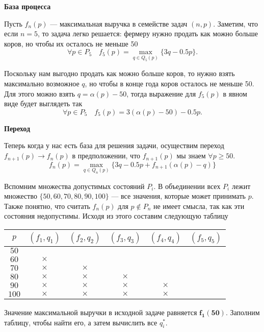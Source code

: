 \bigskip

\textbf{База процесса}

Пусть $f_n(p)$ --- максимальная выручка в семействе задач $(n, p)$. Заметим, что если $n = 5$, то задача легко решается: фермеру нужно продать как можно больше коров, но чтобы их осталось не меньше 50
\[
\forall p \in P_5 \quad f_5(p) = \max_{q \in Q_5(p)} \{3q - 0.5p\}.
\]

Поскольку нам выгодно продать как можно больше коров, то нужно взять максимально возможное $q$, но чтобы в конце года коров осталось не меньше 50. Для этого можно взять $q = \alpha(p) - 50$, тогда выражение для $f_5(p)$ в явном виде будет выглядеть так
\[
\forall p \in P_5 \quad f_5(p) = 3(\alpha(p) - 50) - 0.5p.
\]

\bigskip

\textbf{Переход}

Теперь когда у нас есть база для решения задачи, осуществим переход $f_{n+1}(p) \to f_n(p)$ в предположении, что $f_{n+1}(p)$ мы знаем $\forall p \ge 50$.
\[
\boxed{f_n(p) = \max_{q \in Q_n(p)} \Big\{3q - 0.5p + f_{n + 1}(\alpha(p) - q)\Big\}}\tag{**}
\]

Вспомним множества допустимых состояний $P_i$. В объединении всех $P_i$ лежит множество $\{50, 60, 70, 80, 90, 100\}$ --- все значения, которые может принимать $p$. Также понятно, что считать $f_n(p)$ для $p \notin P_n$ не имеет смысла, так как эти состояния недопустимы. Исходя из этого составим следующую таблицу

\begin{table}[H]
	\centering
	\begin{tabular}{ | c | c | c | c | c | c | } 
		\hline
		$p$ & $(f_1, q_1)$ & $(f_2, q_2)$ & $(f_3, q_3)$ & $(f_4, q_4)$ & $(f_5, q_5)$ \\ 
		\hline
		$50$ & & & & & \\\hline
		$60$ & $\times$ & & & & \\\hline
		$70$ & $\times$ & $\times$ & & & \\\hline
		$80$ & $\times$ & $\times$ & $\times$ & & \\\hline
		$90$ & $\times$ & $\times$ & $\times$ & $\times$ & \\\hline
		$100$ & $\times$ & $\times$ & $\times$ & $\times$ & \\\hline
	\end{tabular}
\end{table}

Значение максимальной выручки в исходной задаче равняется $\mathbf {f_1(50)}$. Заполним таблицу, чтобы найти его, а затем вычислить все $q^*_i$.

